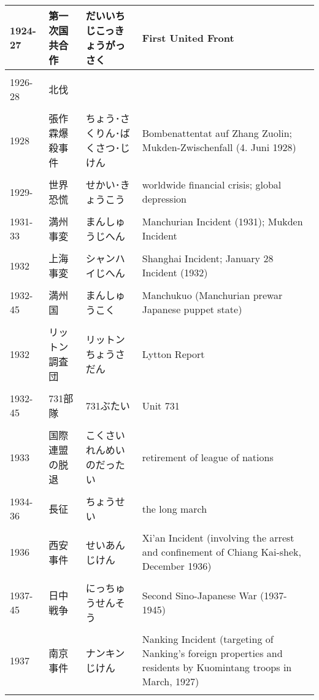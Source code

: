 \documentclass{article}
\begin{document}
\begin{tabular}{p{1.8cm} | p{3.4cm} | p{5.91cm} | p{7.0cm}}
1924-27 & 第一次国共合作 & だいいちじこっきょうがっさく & First United Front \\ \hline \\[-1em]
1926-28 & 北伐 &  &  \\ \hline \\[-1em]
1928    & 張作霖爆殺事件 &  ちょう･さくりん･ばくさつ･じけん & Bombenattentat auf Zhang Zuolin; Mukden-Zwischenfall (4. Juni 1928) \\ \hline \\[-1em]
1929-   & 世界恐慌 & せかい･きょうこう & worldwide financial crisis; global depression \\ \hline \\[-1em]
1931-33 & 満州事変 & まんしゅうじへん & Manchurian Incident (1931); Mukden Incident \\ \hline \\[-1em]
1932    & 上海事変 & シャンハイじへん & Shanghai Incident; January 28 Incident (1932) \\ \hline \\[-1em]
1932-45 & 満州国 & まんしゅうこく & Manchukuo (Manchurian prewar Japanese puppet state) \\ \hline \\[-1em]
1932    & リットン調査団 & リットンちょうさだん & Lytton Report \\ \hline \\[-1em]
1932-45 & 731部隊 & 731ぶたい & Unit 731 \\ \hline \\[-1em]
1933    & 国際連盟の脱退 & こくさいれんめいのだったい & retirement of league of nations \\ \hline \\[-1em]
1934-36 & 長征 & ちょうせい & the long march \\ \hline \\[-1em]
1936    & 西安事件 & せいあんじけん & Xi'an Incident (involving the arrest and confinement of Chiang Kai-shek, December 1936) \\ \hline \\[-1em]
1937-45 & 日中戦争 & にっちゅうせんそう & Second Sino-Japanese War (1937-1945) \\ \hline \\[-1em]
1937    & 南京事件 & ナンキンじけん & Nanking Incident (targeting of Nanking's foreign properties and residents by Kuomintang troops in March, 1927) \\ \hline \\[-1em]

\end{tabular}
\end{document}
